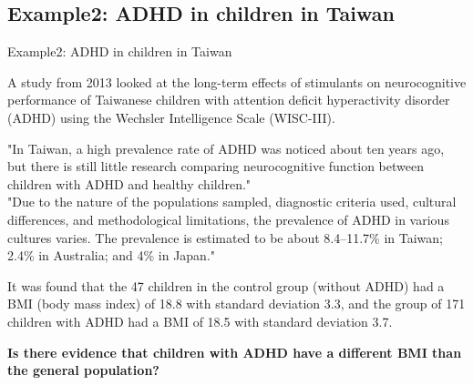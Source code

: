 \documentclass[t,xcolor=pdftex,dvipsnames,table]{beamer}\usepackage[]{graphicx}\usepackage[]{color}
\begin{document}
\subsection[Example2]{Example2: ADHD in children in Taiwan}
\begin{frame}{Example2: ADHD in children in Taiwan}

A study from 2013 looked at the long-term effects of stimulants on neurocognitive performance of Taiwanese children with attention deficit hyperactivity disorder (ADHD) using the Wechsler Intelligence Scale (WISC-III).  

\vspace{.5cm}
"In Taiwan, a high prevalence rate of ADHD was noticed about ten years ago, but there is still little research comparing neurocognitive function between children with ADHD and healthy children."  \\
"Due to the nature of the populations sampled, diagnostic criteria used, cultural differences, and methodological limitations, the prevalence of ADHD in various cultures varies. 
The prevalence is estimated to be about 8.4–11.7\% in Taiwan; 2.4\% in Australia; and 4\% in Japan."
\end{frame}


\begin{frame}{}

It was found that the 47 children in the control group (without ADHD) had a BMI (body mass index) of 18.8 with standard deviation 3.3, and the group of 171 children with ADHD had a BMI of 18.5 with standard deviation 3.7.

\vspace{.5cm}
{\bf Is there evidence that children with ADHD have a different BMI than the general population?}

\href{http://www.ncbi.nlm.nih.gov/pmc/articles/PMC4235029/}{}
\href{http://www.ncbi.nlm.nih.gov/pmc/articles/PMC4235029/table/T1/}{}
\href{http://www.ncbi.nlm.nih.gov/pmc/articles/PMC4235029/table/T2/}{}
\href{http://www.cdc.gov/healthyweight/assessing/bmi/childrens_bmi/about_childrens_bmi.html}{}
\end{frame}
\end{document}
